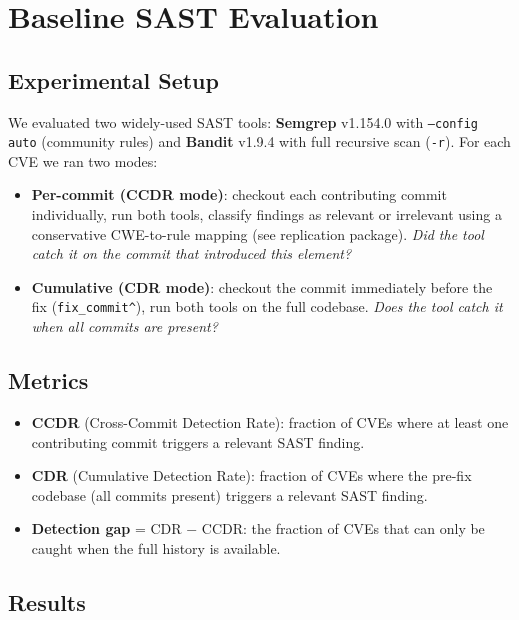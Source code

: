 \documentclass[sigconf,review]{acmart}
\begin{document}
\section{Baseline SAST Evaluation}

\subsection{Experimental Setup}

We evaluated two widely-used SAST tools:
\textbf{Semgrep} v1.154.0 with \texttt{--config auto} (community rules) and
\textbf{Bandit} v1.9.4 with full recursive scan (\texttt{-r}).
For each CVE we ran two modes:

\begin{itemize}
  \item \textbf{Per-commit (CCDR mode)}: checkout each contributing commit individually,
        run both tools, classify findings as relevant or irrelevant using a conservative
        CWE-to-rule mapping (see replication package). \emph{Did the tool catch it on
        the commit that introduced this element?}
  \item \textbf{Cumulative (CDR mode)}: checkout the commit immediately
        before the fix (\texttt{fix\_commit\^{}}), run both tools on the full codebase.
        \emph{Does the tool catch it when all commits are present?}
\end{itemize}

\subsection{Metrics}

\begin{itemize}
  \item \textbf{CCDR} (Cross-Commit Detection Rate): fraction of CVEs where at least one
        contributing commit triggers a relevant SAST finding.
  \item \textbf{CDR} (Cumulative Detection Rate): fraction of CVEs where the pre-fix
        codebase (all commits present) triggers a relevant SAST finding.
  \item \textbf{Detection gap} = CDR $-$ CCDR: the fraction of CVEs that can only be
        caught when the full history is available.
\end{itemize}

\subsection{Results}
\end{document}

